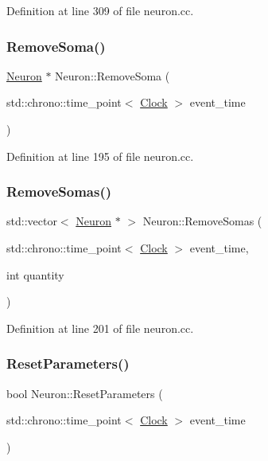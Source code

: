 Definition at line 309 of file neuron.\+cc.

\mbox{\label{class_neuron_a4f8c2f0c1b294493a7c581a7f46c2863}} 
\subsubsection{\texorpdfstring{Remove\+Soma()}{RemoveSoma()}}
{\footnotesize\ttfamily \mbox{\hyperlink{class_neuron}{Neuron}} $\ast$ Neuron\+::\+Remove\+Soma (\begin{DoxyParamCaption}\item[{std\+::chrono\+::time\+\_\+point$<$ \mbox{\hyperlink{universe_8h_a0ef8d951d1ca5ab3cfaf7ab4c7a6fd80}{Clock}} $>$}]{event\+\_\+time }\end{DoxyParamCaption})}



Definition at line 195 of file neuron.\+cc.

\mbox{\label{class_neuron_a976b1bab63d0bd21b1c8c8e1cfbd17fe}} 
\subsubsection{\texorpdfstring{Remove\+Somas()}{RemoveSomas()}}
{\footnotesize\ttfamily std\+::vector$<$ \mbox{\hyperlink{class_neuron}{Neuron}} $\ast$ $>$ Neuron\+::\+Remove\+Somas (\begin{DoxyParamCaption}\item[{std\+::chrono\+::time\+\_\+point$<$ \mbox{\hyperlink{universe_8h_a0ef8d951d1ca5ab3cfaf7ab4c7a6fd80}{Clock}} $>$}]{event\+\_\+time,  }\item[{int}]{quantity }\end{DoxyParamCaption})}



Definition at line 201 of file neuron.\+cc.

\mbox{\label{class_neuron_a4c154fecb0b689d7da9d8d274f067ccf}} 
\subsubsection{\texorpdfstring{Reset\+Parameters()}{ResetParameters()}}
{\footnotesize\ttfamily bool Neuron\+::\+Reset\+Parameters (\begin{DoxyParamCaption}\item[{std\+::chrono\+::time\+\_\+point$<$ \mbox{\hyperlink{universe_8h_a0ef8d951d1ca5ab3cfaf7ab4c7a6fd80}{Clock}} $>$}]{event\+\_\+time }\end{DoxyParamCaption})}



